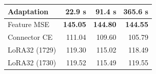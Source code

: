 \begin{tabular}{lrrr}
\toprule
Adaptation & 22.9 s & 91.4 s & 365.6 s \\
\midrule
Feature MSE & \textbf{145.05} & \textbf{144.80} & \textbf{144.55} \\
Connector CE & 111.04 & 109.60 & 105.79 \\
LoRA32 (1729) & 119.30 & 115.02 & 118.49 \\
LoRA32 (1730) & 119.52 & 115.49 & 119.55 \\
\bottomrule
\end{tabular}
